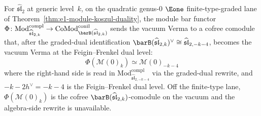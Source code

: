 \begin{proposition}
\label{prop:vacuum-verma-koszul}
For $\widehat{\mathfrak{sl}}_2$ at generic level~$k$, on the
quadratic genus-$0$ $\Eone$ finite-type-graded lane of
Theorem~\ref{thm:e1-module-koszul-duality}, the module bar functor
$\Phi\colon \mathrm{Mod}^{\mathrm{compl}}_{\widehat{\mathfrak{sl}}_{2,k}}
\to \mathrm{CoMod}^{\mathrm{conil}}_{\barB(\widehat{\mathfrak{sl}}_{2,k})}$
sends the vacuum Verma to a cofree comodule that, after the graded-dual
identification $\barB(\widehat{\mathfrak{sl}}_{2,k})^\vee
\cong \widehat{\mathfrak{sl}}_{2,-k-4}$, becomes the vacuum Verma at
the Feigin--Frenkel dual level:
\begin{equation}\label{eq:vacuum-koszul}
\Phi(\mathcal{M}(0)_k) \simeq \mathcal{M}(0)_{-k-4}
\end{equation}
where the right-hand side is read in
$\mathrm{Mod}^{\mathrm{compl}}_{\widehat{\mathfrak{sl}}_{2,-k-4}}$
via the graded-dual rewrite, and $-k - 2h^\vee = -k - 4$ is the
Feigin--Frenkel dual level. Off the finite-type lane,
$\Phi(\mathcal{M}(0)_k)$ is the cofree
$\barB(\widehat{\mathfrak{sl}}_{2,k})$-comodule on the vacuum and the
algebra-side rewrite is unavailable.
\end{proposition}


